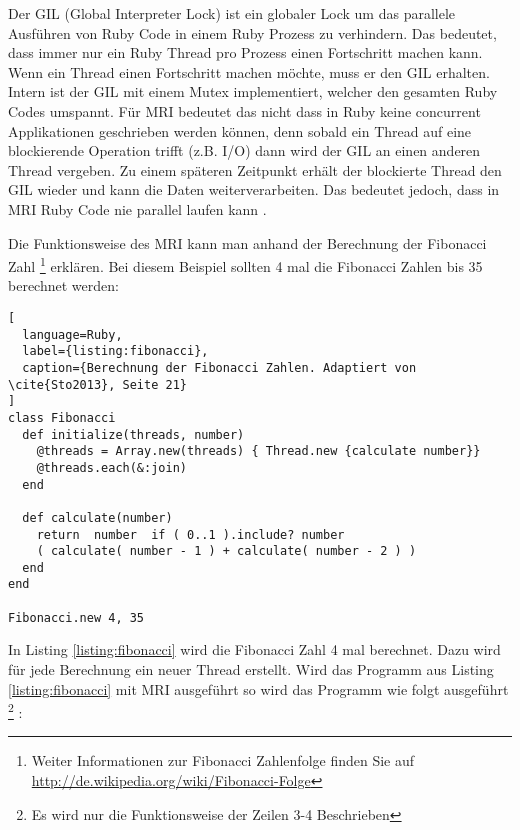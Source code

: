 Der GIL (Global Interpreter Lock) ist ein globaler Lock um das parallele Ausführen von Ruby Code in einem Ruby Prozess zu verhindern. Das bedeutet, dass immer nur ein Ruby Thread pro Prozess einen Fortschritt machen kann. Wenn ein Thread einen Fortschritt machen möchte, muss er den GIL erhalten. Intern ist der GIL mit einem Mutex implementiert, welcher den gesamten Ruby Codes umspannt. Für MRI bedeutet das nicht dass in Ruby keine concurrent Applikationen geschrieben werden können, denn sobald ein Thread auf eine blockierende Operation trifft (z.B. I/O) dann wird der GIL an einen anderen Thread vergeben. Zu einem späteren Zeitpunkt erhält der blockierte Thread den GIL wieder und kann die Daten weiterverarbeiten. Das bedeutet jedoch, dass in MRI Ruby Code nie parallel laufen kann \cite[p. 42]{Sto2013}. 

Die Funktionsweise des MRI kann man anhand der Berechnung der Fibonacci Zahl \footnote{Weiter Informationen zur Fibonacci Zahlenfolge finden Sie auf \url{http://de.wikipedia.org/wiki/Fibonacci-Folge}} erklären. Bei diesem Beispiel sollten 4 mal die Fibonacci Zahlen bis 35 berechnet werden:

\begin{lstlisting}[
  language=Ruby,
  label={listing:fibonacci},
  caption={Berechnung der Fibonacci Zahlen. Adaptiert von \cite{Sto2013}, Seite 21}
]
class Fibonacci
  def initialize(threads, number)
    @threads = Array.new(threads) { Thread.new {calculate number}}
    @threads.each(&:join)
  end

  def calculate(number)
    return  number  if ( 0..1 ).include? number
    ( calculate( number - 1 ) + calculate( number - 2 ) )
  end
end

Fibonacci.new 4, 35
\end{lstlisting}

In Listing \ref{listing:fibonacci} wird die Fibonacci Zahl 4 mal berechnet. Dazu wird für jede Berechnung ein neuer Thread erstellt. Wird das Programm aus Listing \ref{listing:fibonacci} mit MRI ausgeführt so wird das Programm wie folgt ausgeführt \footnote{Es wird nur die Funktionsweise der Zeilen 3-4 Beschrieben} \cite[p. 45-46]{Sto2013}: 

